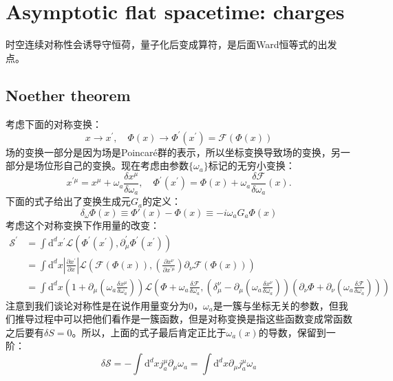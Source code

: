 \section{Asymptotic flat spacetime: charges}
时空连续对称性会诱导守恒荷，量子化后变成算符，是后面Ward恒等式的出发点。
\subsection{Noether theorem}
考虑下面的对称变换：
\[x\to x^{\prime},\quad\Phi(x)\to\Phi^{\prime}(x^{\prime})=\mathcal{F}(\Phi(x))\]
场的变换一部分是因为场是Poincar\'e群的表示，所以坐标变换导致场的变换，另一部分是场位形自己的变换。现在考虑由参数$\{\omega_a\}$标记的无穷小变换：
\[
x^{\prime\mu} =x^{\mu}+\omega_{a}\frac{\delta x^{\mu}}{\delta\omega_{a}},  \quad
\Phi^{\prime}(x^{\prime})=\Phi(x)+\omega_{a}\frac{\delta\mathcal{F}}{\delta\omega_{a}}(x).
\]
下面的式子给出了变换生成元$G_a$的定义：
\begin{equation}
	\delta_\omega\Phi(x)\equiv\Phi'(x)-\Phi(x)\equiv-i\omega_aG_a\Phi(x)
\end{equation}
考虑这个对称变换下作用量的改变：
\begin{equation}
	\begin{aligned}
		\mathcal{S}^\prime& =\int\mathrm{d}^{d}x^{\prime}{\mathcal L}(\Phi^{\prime}(x^{\prime}),\partial_{\mu}^{\prime}\Phi^{\prime}(x^{\prime}))  \\
		&=\int\mathrm{d}^{d}x\left|\frac{\partial x^{\prime}}{\partial x}\right|\mathcal{L}(\mathcal{F}(\Phi(x)),(\frac{\partial x^{\nu}}{\partial x^{\prime\mu}})\partial_{\nu}\mathcal{F}(\Phi(x)))\\
		&=\int\mathrm{d}^dx\left(1+\partial_\mu(\omega_a\frac{\delta x^\mu}{\delta\omega_a})\right)\mathcal{L}\left(\Phi+\omega_a\frac{\delta\mathcal{F}}{\delta\omega_a},\left(\delta_\mu^\nu-\partial_\mu(\omega_a\frac{\delta x^\nu}{\delta\omega_a})\right)\left(\partial_\nu\Phi+\partial_\nu(\omega_a\frac{\delta\mathcal{F}}{\delta\omega_a})\right)\right)
	\end{aligned}
\end{equation}
注意到我们谈论对称性是在说作用量变分为$0$，$\omega_a$是一簇与坐标无关的参数，但我们推导过程中可以把他们看作是一簇函数，但是对称变换是指这些函数变成常函数之后要有$\delta S=0$。所以，上面的式子最后肯定正比于$\omega_a(x)$的导数，保留到一阶：
\begin{equation}\label{eq:19.2}
	\delta\mathcal{S}=-\int\mathrm{d}^{d}xj_{a}^{\mu}\partial_{\mu}\omega_{a}=\int\mathrm{d}^{d}x\partial_{\mu}j_{a}^{\mu}\omega_{a}
\end{equation}
